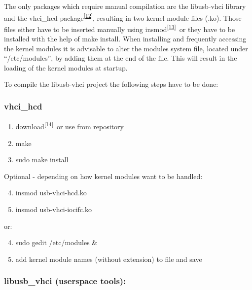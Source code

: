 {The only packages which require manual compilation are the libusb-vhci
library and the vhci\_hcd
package}\textsuperscript{\protect\hyperlink{ftnt12}{{[}12{]}}}{,
resulting in two kernel module files (.ko). Those files either have to
be inserted manually using
}{insmod}\textsuperscript{\protect\hyperlink{ftnt13}{{[}13{]}}}{~or they
have to be installed with the help of make install. When installing and
frequently accessing the kernel modules it is advisable to alter the
modules system file, located under ``/etc/modules'', by adding them at
the end of the file. This will result in the loading of the kernel
modules at startup.}

{To compile the libusb-vhci project the following steps have to be
done:}

\hypertarget{h.agltrea2kef8}{\subsubsection{\texorpdfstring{{vhci\_hcd}}{vhci\_hcd}}\label{h.agltrea2kef8}}

\begin{enumerate}
\tightlist
\item
  {download}\textsuperscript{\protect\hyperlink{ftnt14}{{[}14{]}}}{~or
  use from repository}
\item
  {make}
\item
  {sudo make install}
\end{enumerate}

{Optional - depending on how kernel modules want to be handled:}

\begin{enumerate}
\setcounter{enumi}{3}
\tightlist
\item
  {insmod usb-vhci-hcd.ko}
\item
  {insmod usb-vhci-iocifc.ko}
\end{enumerate}

{or:}

\begin{enumerate}
\setcounter{enumi}{3}
\tightlist
\item
  {sudo gedit /etc/modules \&}
\item
  {add kernel module names (without extension) to file and save}
\end{enumerate}

\hypertarget{h.8woybtsjfs8s}{\subsubsection{\texorpdfstring{{libusb\_vhci
(userspace
tools):}}{libusb\_vhci (userspace tools):}}\label{h.8woybtsjfs8s}}

